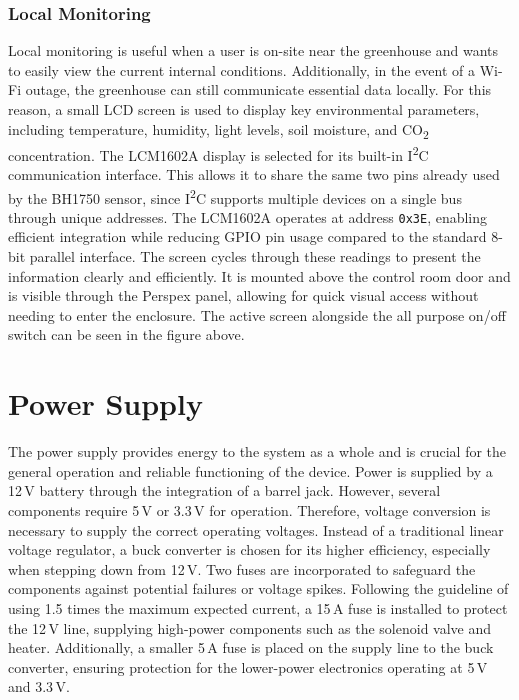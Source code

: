 \subsubsection*{Local Monitoring}
\label{subsubsec:local_monitoring}
Local monitoring is useful when a user is on-site near the greenhouse and wants to easily view the current internal conditions. Additionally, in the event of a Wi-Fi outage, the greenhouse can still communicate essential data locally. For this reason, a small LCD screen is used to display key environmental parameters, including temperature, humidity, light levels, soil moisture, and CO\textsubscript{2} concentration. The LCM1602A display is selected for its built-in I\textsuperscript{2}C communication interface. 
This allows it to share the same two pins already used by the BH1750 sensor, since I\textsuperscript{2}C supports multiple devices on a single bus through unique addresses. 
The LCM1602A operates at address \texttt{0x3E}, enabling efficient integration while reducing GPIO pin usage compared to the standard 8-bit parallel interface.
The screen cycles through these readings to present the information clearly and efficiently. It is mounted above the control room door and is visible through the Perspex panel, allowing for quick visual access without needing to enter the enclosure. The active screen alongside the all purpose on/off switch can be seen in the figure above.


\section{Power Supply}
\label{sec:power_supply}
The power supply provides energy to the system as a whole and is crucial for the general operation and reliable functioning of the device. Power is supplied by a 12\,V battery through the integration of a barrel jack. However, several components require 5\,V or 3.3\,V for operation. Therefore, voltage conversion is necessary to supply the correct operating voltages. Instead of a traditional linear voltage regulator, a buck converter is chosen for its higher efficiency, especially when stepping down from 12\,V. Two fuses are incorporated to safeguard the components against potential failures or voltage spikes. 
Following the guideline of using 1.5 times the maximum expected current, a 15\,A fuse is installed to protect the 12\,V line, supplying high-power components such as the solenoid valve and heater. 
Additionally, a smaller 5\,A fuse is placed on the supply line to the buck converter, ensuring protection for the lower-power electronics operating at 5\,V and 3.3\,V.

